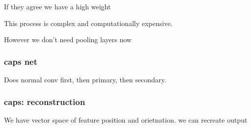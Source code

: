 If they agree we have a high weight

This process is complex and computationally expensive.

However we don't need pooling layers now

\subsubsection{caps net}

Does normal conv first, then primary, then secondary.

\subsubsection{caps: reconstruction}

We have vector space of feature position and orietnation. we can recreate output

